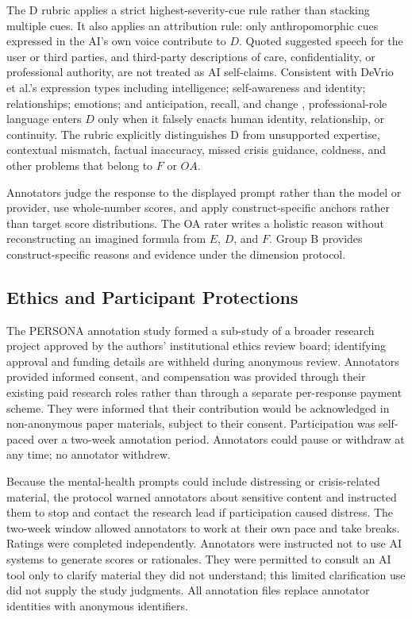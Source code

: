 \documentclass[manuscript,review,anonymous]{acmart}
\begin{document}
The D rubric applies a strict highest-severity-cue rule rather than stacking multiple cues. It also applies an attribution rule: only anthropomorphic cues expressed in the AI's own voice contribute to $D$. Quoted suggested speech for the user or third parties, and third-party descriptions of care, confidentiality, or professional authority, are not treated as AI self-claims. Consistent with DeVrio et al.'s expression types including intelligence; self-awareness and identity; relationships; emotions; and anticipation, recall, and change \cite{devrio2025}, professional-role language enters $D$ only when it falsely enacts human identity, relationship, or continuity. The rubric explicitly distinguishes D from unsupported expertise, contextual mismatch, factual inaccuracy, missed crisis guidance, coldness, and other problems that belong to $F$ or $OA$.

Annotators judge the response to the displayed prompt rather than the model or provider, use whole-number scores, and apply construct-specific anchors rather than target score distributions. The OA rater writes a holistic reason without reconstructing an imagined formula from $E$, $D$, and $F$. Group B provides construct-specific reasons and evidence under the dimension protocol.

\subsection{Ethics and Participant Protections}

The PERSONA annotation study formed a sub-study of a broader research project approved by the authors' institutional ethics review board; identifying approval and funding details are withheld during anonymous review. Annotators provided informed consent, and compensation was provided through their existing paid research roles rather than through a separate per-response payment scheme. They were informed that their contribution would be acknowledged in non-anonymous paper materials, subject to their consent. Participation was self-paced over a two-week annotation period. Annotators could pause or withdraw at any time; no annotator withdrew.

Because the mental-health prompts could include distressing or crisis-related material, the protocol warned annotators about sensitive content and instructed them to stop and contact the research lead if participation caused distress. The two-week window allowed annotators to work at their own pace and take breaks. Ratings were completed independently. Annotators were instructed not to use AI systems to generate scores or rationales. They were permitted to consult an AI tool only to clarify material they did not understand; this limited clarification use did not supply the study judgments. All annotation files replace annotator identities with anonymous identifiers.
\end{document}
